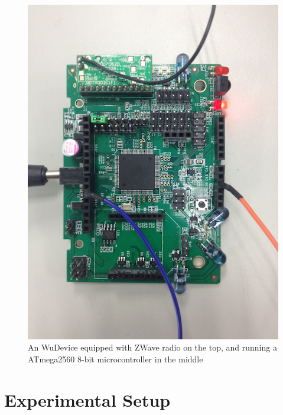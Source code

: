 \begin{figure}[h!]
\centering
    \includegraphics[width=\linewidth]{figures/wudevice}
\caption{An WuDevice equipped with ZWave radio on the top, and running
  a ATmega2560 8-bit microcontroller in the middle}
\label{fig:wudevice}
\end{figure}

\section{Experimental Setup}


